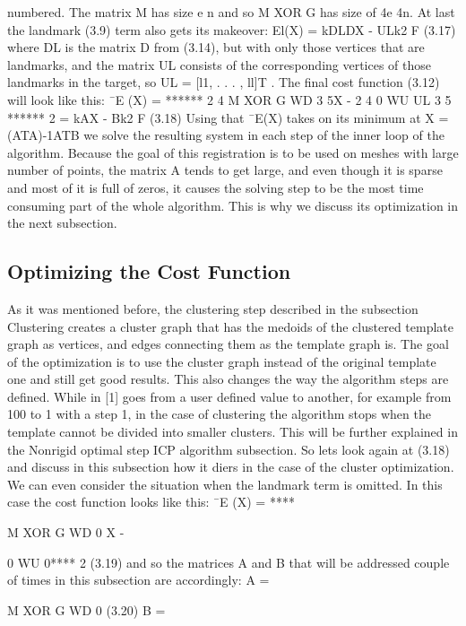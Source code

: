 \documentclass[../structure.tex]{subfiles}
\begin{document}
numbered.
The matrix M has size e  n and so M XOR G has size of 4e  4n.
At last the landmark (3.9) term also gets its makeover:
El(X) = kDLDX - ULk2
F (3.17)
where DL is the matrix D from (3.14), but with only those vertices that
are landmarks, and the matrix UL consists of the corresponding vertices of
those landmarks in the target, so UL = [l1, . . . , ll]T .
The final cost function (3.12) will look like this:
¯E
(X) =
******
2
4
M XOR G
WD
3
5X -
2
4
0
WU
UL
3
5
******
2
= kAX - Bk2
F (3.18)
Using that ¯E(X) takes on its minimum at X = (ATA)-1ATB we solve
the resulting system in each step of the inner loop of the algorithm. Because
the goal of this registration is to be used on meshes with large number of
points, the matrix A tends to get large, and even though it is sparse and most
of it is full of zeros, it causes the solving step to be the most time consuming
part of the whole algorithm. This is why we discuss its optimization in the
next subsection.
\subsection{Optimizing the Cost Function}
As it was mentioned before, the clustering step described in the subsection
Clustering creates a cluster graph that has the medoids of the clustered
template graph as vertices, and edges connecting them as the template graph
is. The goal of the optimization is to use the cluster graph instead of the
original template one and still get good results. This also changes the way the
algorithm steps are defined. While in [1]  goes from a user defined value to
another, for example from 100 to 1 with a step 1, in the case of clustering the
algorithm stops when the template cannot be divided into smaller clusters.
This will be further explained in the Nonrigid optimal step ICP algorithm
subsection.
So lets look again at (3.18) and discuss in this subsection how it diers
in the case of the cluster optimization. We can even consider the situation
when the landmark term is omitted. In this case the cost function looks like
this:
¯E
(X) =
****

M XOR G
WD
0
X -

0
WU
0****
2
(3.19)
and so the matrices A and B that will be addressed couple of times in
this subsection are accordingly:
A =

M XOR G
WD
0
(3.20)
B =
\end{document}

